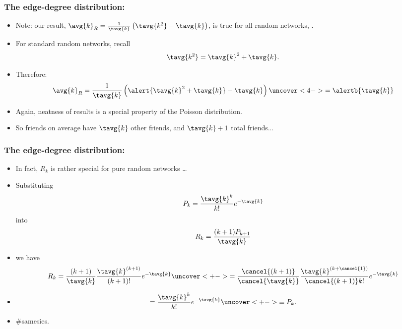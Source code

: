 \begin{frame}
  \frametitle{The edge-degree distribution:}

  \begin{itemize}
  \item<1-> Note: our result, 
    $
    \avg{k}_{R}
    =
    \frac{1}{\tavg{k}}
    \left(
      \tavg{k^2} - \tavg{k}
    \right)
    $,
    is true for \alert{all} random networks, 
    .
  \item<2->
    For standard random networks, recall
    $$
    \tavg{k^2} = \tavg{k}^2 + \tavg{k}.
    $$
  \item<3->
    Therefore:
    $$
    \avg{k}_{R}
    =
    \frac{1}{\tavg{k}}
    \left(
      \alert{\tavg{k}^2 + \tavg{k}} - \tavg{k}
    \right)
    \uncover<4->{
      = \alertb{\tavg{k}}
    }
    $$
  \item<5->
    Again, neatness of results is a special property of the Poisson distribution.
  \item<6->
    So friends on average have $\tavg{k}$ other friends,
    and $\tavg{k}+1$ total friends...
  \end{itemize}

\end{frame}

\begin{frame}
  \frametitle{The edge-degree distribution:}

  \begin{itemize}
  \item<+->
    In fact, $R_k$ is rather special for pure random networks \ldots
  \item<+->
    Substituting
    $$
    P_k
    =
    \frac{\tavg{k}^k}
    {k!}
    e^{-\tavg{k}}
    $$
    into
    $$
    R_k
    =
    \frac{(k+1)P_{k+1}}
    {\tavg{k}}
    $$
  \item<+->[]
    we have
    $$
    R_k
    =
    \frac{(k+1)}
    {\tavg{k}}
    \frac{\tavg{k}^{(k+1)}}
    {(k+1)!}
    e^{-\tavg{k}}
    \uncover<+->{
    =
    \frac{\cancel{(k+1)}}
    {\cancel{\tavg{k}}}
    \frac{\tavg{k}^{(k+\cancel{1})}}
    {\cancel{(k+1)} k!}
    e^{-\tavg{k}}
    }
    $$
  \item<+->[]
    $$
    =
    \frac{\tavg{k}^{k}}
    {k!}
    e^{-\tavg{k}}
    \uncover<+->{
    \equiv P_k.}
    $$
  \item<+->
    \#samesies.
  \end{itemize}
 
\end{frame}

